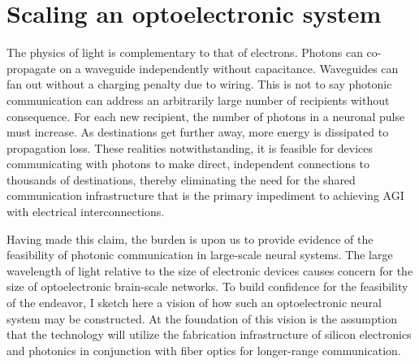 \documentclass[twocolumn]{article}
\begin{document}
\section{\label{sec:communication}Scaling an optoelectronic system}
The physics of light is complementary to that of electrons. Photons can co-propagate on a waveguide independently without capacitance. Waveguides can fan out without a charging penalty due to wiring. This is not to say photonic communication can address an arbitrarily large number of recipients without consequence. For each new recipient, the number of photons in a neuronal pulse must increase. As destinations get further away, more energy is dissipated to propagation loss. These realities notwithstanding, it is feasible for devices communicating with photons to make direct, independent connections to thousands of destinations, thereby eliminating the need for the shared communication infrastructure that is the primary impediment to achieving AGI with electrical interconnections.

Having made this claim, the burden is upon us to provide evidence of the feasibility of photonic communication in large-scale neural systems. The large wavelength of light relative to the size of electronic devices causes concern for the size of optoelectronic brain-scale networks. To build confidence for the feasibility of the endeavor, I sketch here a vision of how such an optoelectronic neural system may be constructed. At the foundation of this vision is the assumption that the technology will utilize the fabrication infrastructure of silicon electronics and photonics in conjunction with fiber optics for longer-range communication. 
\end{document}
